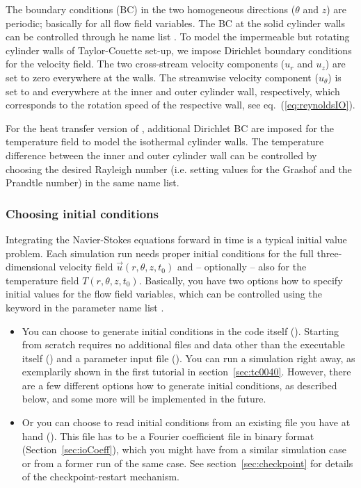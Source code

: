 \documentclass[a4paper, 11pt, DIV=11]{scrartcl}
\begin{document}
The boundary conditions (BC) in the two homogeneous directions ($\theta$ and $z$) are
periodic; basically for all flow field variables. The BC at the solid cylinder walls can be
controlled through he name list . To model the impermeable
but rotating cylinder walls of Taylor-Couette set-up, we impose Dirichlet boundary
conditions for the velocity field. The two cross-stream velocity components ($u_r$ and
$u_z$) are set to zero everywhere at the walls. The streamwise velocity component
($u_{\theta}$) is set to \Rei and \Reo everywhere at the inner and outer cylinder wall,
respectively, which corresponds to the rotation speed of the respective wall, see
eq.~(\ref{eq:reynoldsIO}).
\par
For the heat transfer version of \nsc, additional Dirichlet BC are imposed for the
temperature field to model the isothermal cylinder walls. The temperature difference
between the inner and outer cylinder wall can be controlled by choosing the desired
Rayleigh number (i.e. setting values for the Grashof and the Prandtle number) in the
same name list.

\subsubsection{Choosing initial conditions}
\label{sec:initialConditions}

Integrating the Navier-Stokes equations forward in time is a typical initial
value problem. Each simulation run needs proper initial conditions for the
full three-dimensional velocity field $\vec{u}(r,\theta,z,t_0)$ and --
optionally -- also for the temperature field $T(r,\theta,z,t_0)$. Basically,
you have two options how to specify initial values for the flow field
variables, which can be controlled using the keyword  in the
parameter name list .
\begin{itemize}
\item 
You can choose to generate initial conditions in the code itself
(). Starting from scratch requires no additional
files and data other than the executable itself ()
and a parameter input file (). You can run a
simulation right away, as exemplarily shown in the first tutorial
in section~\ref{sec:tc0040}. However, there are a few different
options how to generate initial conditions, as described below, and
some more will be implemented in the future.
\item
Or you can choose to read initial conditions from an existing file
you have at hand (). This file has to be a Fourier
coefficient file in binary format (Section~\ref{sec:ioCoeff}), which
you might have from a similar simulation case or from a former run
of the same case. See section~\ref{sec:checkpoint} for details of
the checkpoint-restart mechanism.
\end{itemize}
\end{document}
